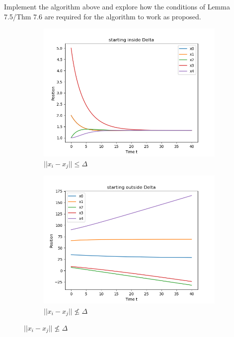 \documentclass{article}
\begin{document}
\begin{problem}
    \vspace{12pt}
    Implement the algorithm above and explore how the conditions of Lemma 7.5/Thm 7.6 are required for the algorithm to work as proposed.
    \begin{figure}[!h]
        \centering
        \begin{subfigure}{0.3\textwidth}
            \includegraphics[width=\textwidth]{./img/p3_1.png}
            \caption{$||x_i - x_j|| \leq \Delta$}
        \end{subfigure}
        \begin{subfigure}{0.3\textwidth}
            \includegraphics[width=\textwidth]{./img/p3_2.png}
            \caption{$||x_i - x_j|| \nleq \Delta$}
        \end{subfigure}

\end{figure}
\end{problem}
\end{document}
